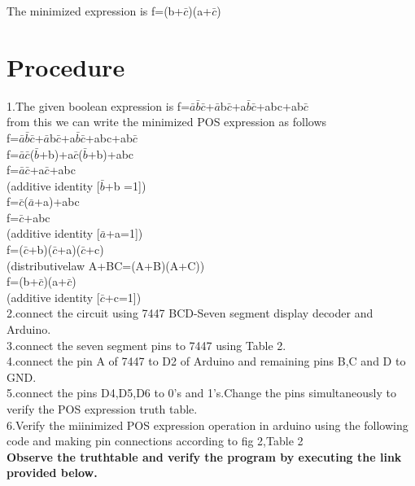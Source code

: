 \documentclass[journal,12pt,twocolumn]{IEEEtran}
\begin{document}
The minimized expression is f=(b+$\bar{c}$)(a+$\bar{c}$)

\section{\textbf{Procedure}}
1.The given boolean expression is f=$\bar{a}$$\bar{b}$$\bar{c}$+$\bar{a}$b$\bar{c}$+a$\bar{b}$$\bar{c}$+abc+ab$\bar{c}$\\
from this we can write the minimized POS expression as follows\\
f=$\bar{a}$$\bar{b}$$\bar{c}$+$\bar{a}$b$\bar{c}$+a$\bar{b}$$\bar{c}$+abc+ab$\bar{c}$\\
f=$\bar{a}$$\bar{c}$($\bar{b}$+b)+a$\bar{c}$($\bar{b}$+b)+abc\\
f=$\bar{a}$$\bar{c}$+a$\bar{c}$+abc \\(additive identity [$\bar{b}$+b =1])\\
f=$\bar{c}$($\bar{a}$+a)+abc\\
f=$\bar{c}$+abc \\(additive identity [$\bar{a}$+a=1])\\
f=($\bar{c}$+b)($\bar{c}$+a)($\bar{c}$+c)\\(distributivelaw A+BC=(A+B)(A+C))\\
f=(b+$\bar{c}$)(a+$\bar{c}$) \\(additive identity [$\bar{c}$+c=1])\\
2.connect the circuit using 7447 BCD-Seven segment display decoder and Arduino.\\
3.connect the seven segment pins to 7447 using Table 2.\\
4.connect the pin A of 7447 to D2 of Arduino and remaining pins B,C and D to GND.\\ 
5.connect the pins D4,D5,D6 to 0's and 1's.Change the pins simultaneously to verify the POS expression truth table.\\
6.Verify the miinimized POS expression operation in arduino using the following code and making pin connections according to fig 2,Table 2\\

\textbf{Observe the truthtable and verify the program by executing the link provided below.}\\
\begin{center}
\end{center}
\end{document}
